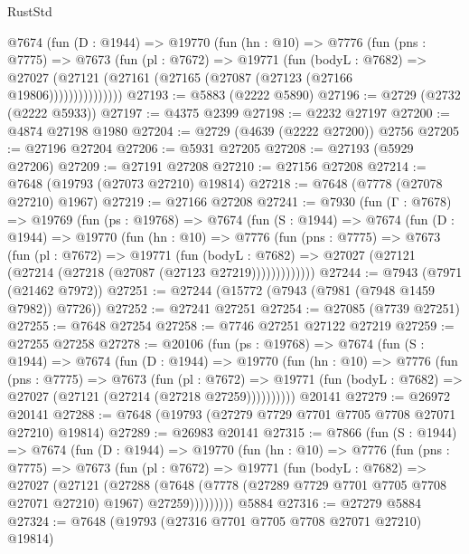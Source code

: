 \begin{lexlean}{RustStd}
\begin{coremodule}
          @7674
            (fun (D : @1944) =>
            @19770
              (fun (hn : @10) =>
              @7776
                (fun (pns : @7775) =>
                @7673
                  (fun (pl : @7672) =>
                  @19771
                    (fun (bodyL : @7682) =>
                    @27027 (@27121 (@27161 (@27165 (@27087 (@27123 (@27166 @19806)))))))))))))))
@27193 := @5883 (@2222 @5890)
@27196 := @2729 (@2732 (@2222 @5933))
@27197 := @4375 @2399
@27198 := @2232 @27197
@27200 := @4874 @27198 @1980
@27204 := @2729 (@4639 (@2222 @27200)) @2756
@27205 := @27196 @27204
@27206 := @5931 @27205
@27208 := @27193 (@5929 @27206)
@27209 := @27191 @27208
@27210 := @27156 @27208
@27214 := @7648 (@19793 (@27073 @27210) @19814)
@27218 := @7648 (@7778 (@27078 @27210) @1967)
@27219 := @27166 @27208
@27241 := @7930
    (fun (Γ : @7678) =>
    @19769
      (fun (ps : @19768) =>
      @7674
        (fun (S : @1944) =>
        @7674
          (fun (D : @1944) =>
          @19770
            (fun (hn : @10) =>
            @7776
              (fun (pns : @7775) =>
              @7673
                (fun (pl : @7672) =>
                @19771
                  (fun (bodyL : @7682) =>
                  @27027 (@27121 (@27214 (@27218 (@27087 (@27123 @27219)))))))))))))
@27244 := @7943 (@7971 (@21462 @7972))
@27251 := @27244 (@15772 (@7943 (@7981 (@7948 @1459 @7982)) @7726))
@27252 := @27241 @27251
@27254 := @27085 (@7739 @27251)
@27255 := @7648 @27254
@27258 := @7746 @27251 @27122 @27219
@27259 := @27255 @27258
@27278 := @20106
    (fun (ps : @19768) =>
    @7674
      (fun (S : @1944) =>
      @7674
        (fun (D : @1944) =>
        @19770
          (fun (hn : @10) =>
          @7776
            (fun (pns : @7775) =>
            @7673
              (fun (pl : @7672) =>
              @19771 (fun (bodyL : @7682) => @27027 (@27121 (@27214 (@27218 @27259))))))))))
    @20141
@27279 := @26972 @20141
@27288 := @7648 (@19793 (@27279 @7729 @7701 @7705 @7708 @27071 @27210) @19814)
@27289 := @26983 @20141
@27315 := @7866
    (fun (S : @1944) =>
    @7674
      (fun (D : @1944) =>
      @19770
        (fun (hn : @10) =>
        @7776
          (fun (pns : @7775) =>
          @7673
            (fun (pl : @7672) =>
            @19771
              (fun (bodyL : @7682) =>
              @27027
                (@27121
                  (@27288
                    (@7648
                      (@7778 (@27289 @7729 @7701 @7705 @7708 @27071 @27210) @1967)
                      @27259)))))))))
    @5884
@27316 := @27279 @5884
@27324 := @7648 (@19793 (@27316 @7701 @7705 @7708 @27071 @27210) @19814)

\end{coremodule}
\end{lexlean}
